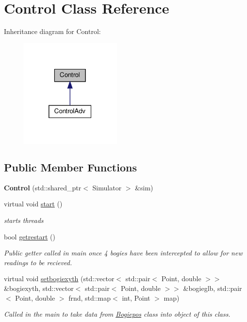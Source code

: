 \hypertarget{classControl}{}\section{Control Class Reference}
\label{classControl}


Inheritance diagram for Control\+:\nopagebreak
\begin{figure}[H]
\begin{center}
\leavevmode
\includegraphics[width=145pt]{classControl__inherit__graph}
\end{center}
\end{figure}
\subsection*{Public Member Functions}
\begin{DoxyCompactItemize}
\item 
\mbox{\label{classControl_a343774819922207def027e98b0bc3198}} 
{\bfseries Control} (std\+::shared\+\_\+ptr$<$ Simulator $>$ \&sim)
\item 
\mbox{\label{classControl_a933994a3524f2f6d7ef0a17086e7cf66}} 
virtual void \hyperlink{classControl_a933994a3524f2f6d7ef0a17086e7cf66}{start} ()
\begin{DoxyCompactList}\small\item\em starts threads \end{DoxyCompactList}\item 
bool \hyperlink{classControl_af7401b14ae40f38234d29b6adaf5d8a6}{getrestart} ()
\begin{DoxyCompactList}\small\item\em Public getter called in main once 4 bogies have been intercepted to allow for new readings to be recieved. \end{DoxyCompactList}\item 
virtual void \hyperlink{classControl_aff1c1cb4117bcdff659978feb6d45a8f}{setbogiexyth} (std\+::vector$<$ std\+::pair$<$ Point, double $>$$>$ \&bogiexyth, std\+::vector$<$ std\+::pair$<$ Point, double $>$$>$ \&bogieglb, std\+::pair$<$ Point, double $>$ frnd, std\+::map$<$ int, Point $>$ map)
\begin{DoxyCompactList}\small\item\em Called in the main to take data from \hyperlink{classBogiepos}{Bogiepos} class into object of this class. \end{DoxyCompactList}\end{DoxyCompactItemize}
